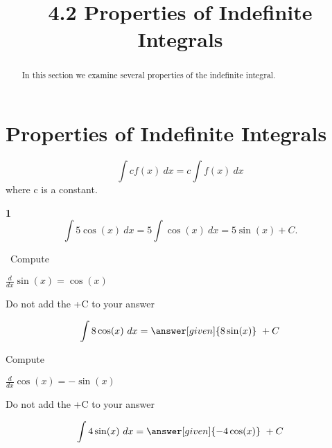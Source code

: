 \documentclass{ximera}
\title{4.2 Properties of Indefinite Integrals}
\begin{document}
\begin{abstract}
In this section we examine several properties of the indefinite integral.
\end{abstract}

\maketitle

\section{Properties of Indefinite Integrals}

\begin{theorem}
\[\int cf(x) \ dx = c\int f(x) \ dx\]
where c is a constant.
\end{theorem}


\begin{example} {\bf 1} %
\[
\int 5\cos(x) \ dx = 5 \int \cos(x) \ dx = 5\sin(x) +C.
\]
\end{example}


\begin{problem} %
\ Compute

\begin{hint}
$\frac{d}{dx} \sin(x) = \cos(x)$
\end{hint}
\begin{hint}
\begin{center}
Do not add the +C to your answer
\end{center}
\end{hint}

\[
\int 8\cos(x) \ dx =
\answer[given]{8\sin(x)} \ +  C
\]
\end{problem}



\begin{problem} %
Compute

\begin{hint}
$\frac{d}{dx} \cos(x) = -\sin(x)$
\end{hint}
\begin{hint}
\begin{center}
Do not add the +C to your answer
\end{center}
\end{hint}

\[
\int 4\sin(x) \ dx =
\answer[given]{-4\cos(x)} \ +  C
\]
\end{problem}
\end{document}
